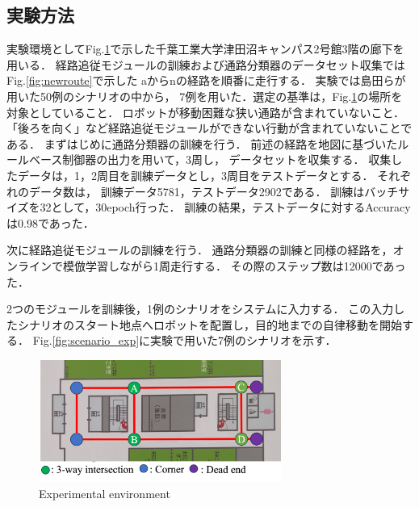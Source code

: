 \documentclass{sice-si}
\begin{document}
\subsection{実験方法}
実験環境としてFig.\ref{fig:cit3f}で示した千葉工業大学津田沼キャンパス2号館3階の廊下を用いる．
経路追従モジュールの訓練および通路分類器のデータセット収集ではFig.\ref{fig:newroute}で示した
aからnの経路を順番に走行する．
実験では島田らが用いた50例のシナリオの中から，
7例を用いた．選定の基準は，Fig.\ref{fig:cit3f}の場所を対象としていること．
ロボットが移動困難な狭い通路が含まれていないこと．
「後ろを向く」など経路追従モジュールができない行動が含まれていないことである．
まずはじめに通路分類器の訓練を行う．
前述の経路を地図に基づいたルールベース制御器の出力を用いて，3周し，
データセットを収集する．
収集したデータは，1，2周目を訓練データとし，3周目をテストデータとする．
それぞれのデータ数は，
訓練データ5781，テストデータ2902である．
訓練はバッチサイズを32として，30epoch行った．
訓練の結果，テストデータに対するAccuracyは0.98であった．\par
次に経路追従モジュールの訓練を行う．
通路分類器の訓練と同様の経路を，オンラインで模倣学習しながら1周走行する．
その際のステップ数は12000であった．
\par
2つのモジュールを訓練後，1例のシナリオをシステムに入力する．
この入力したシナリオのスタート地点へロボットを配置し，目的地までの自律移動を開始する．
Fig.\ref{fig:scenario_exp}に実験で用いた7例のシナリオを示す．
\begin{figure}[htbp]
    \centering
     \includegraphics[height=40mm,width=80mm]{./figs/cit3f.png}
     \caption{Experimental environment}\label{fig:cit3f}
\end{figure}
\end{document}
